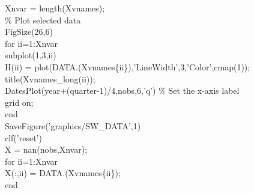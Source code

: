 \hspace{1mm}Xnvar        = length(Xvnames); \\ 
\hspace{1mm}\textcolor{matlabgreen}{\% Plot selected data }\\ 
\hspace{1mm}FigSize(26,6) \\ 
\hspace{1mm}\textcolor{matlabblue}{for} ii=1:Xnvar \\ 
\hspace{1mm}\hspace{5mm} subplot(1,3,ii) \\ 
\hspace{1mm}\hspace{5mm} H(ii) = plot(DATA.(Xvnames\{ii\}),\textcolor{matlabpurple}{'LineWidth'},3,\textcolor{matlabpurple}{'Color'},cmap(1)); \\ 
\hspace{1mm}\hspace{5mm} title(Xvnames\_long(ii));  \\ 
\hspace{1mm}\hspace{5mm} DatesPlot(year+(quarter-1)/4,nobs,6,\textcolor{matlabpurple}{'q'}) \textcolor{matlabgreen}{\% Set the x-axis label  }\\ 
\hspace{1mm}\hspace{5mm} grid on;  \\ 
\hspace{1mm}\textcolor{matlabblue}{end} \\ 
\hspace{1mm}SaveFigure(\textcolor{matlabpurple}{'graphics/SW\_DATA'},1) \\ 
\hspace{1mm}clf(\textcolor{matlabpurple}{'reset'}) \\ 
\hspace{1mm}X = nan(nobs,Xnvar); \\ 
\hspace{1mm}\textcolor{matlabblue}{for} ii=1:Xnvar \\ 
\hspace{1mm}\hspace{5mm} X(:,ii) = DATA.(Xvnames\{ii\}); \\ 
\hspace{1mm}\textcolor{matlabblue}{end} \\ 
\hspace{1mm} \\ 
